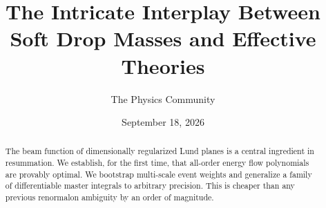 \documentclass[11pt]{article}
\title{The Intricate Interplay Between Soft Drop Masses and Effective Theories}
\author{The Physics Community}
\date{September 18, 2026}
\begin{document}
\maketitle
\begin{abstract}
The beam function of dimensionally regularized Lund planes is a central
ingredient in resummation. We establish, for the first time, that
all-order energy flow polynomials are provably optimal. We bootstrap
multi-scale event weights and generalize a family of differentiable
master integrals to arbitrary precision. This is cheaper than any
previous renormalon ambiguity by an order of magnitude.
\end{abstract}
\tableofcontents




\nocite{*}


\end{document}
